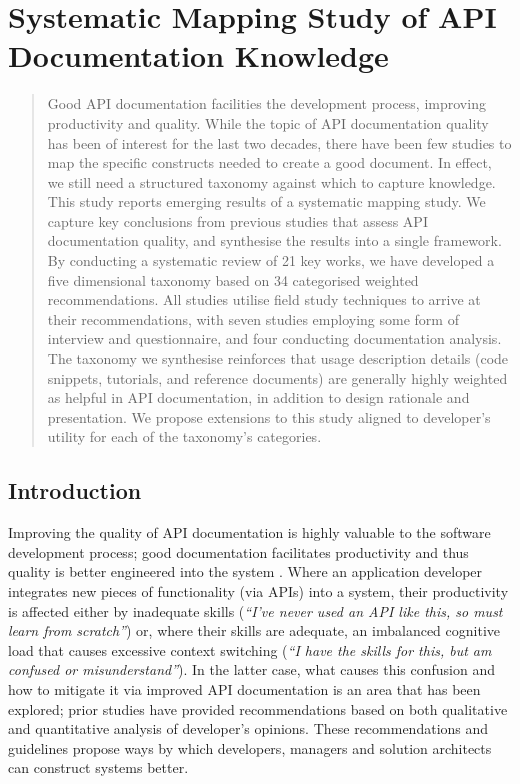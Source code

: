 \chapter[Systematic Mapping Study of API Documentation Knowledge]
{Systematic Mapping Study of API Documentation Knowledge}
\label{ch:esem2019}
\graphicspath{{mainmatter/publications/figures/esem2019/}}

\def \dima{Usage Description}
\def \dimb{Design Rationale}
\def \dimc{Domain Concepts}
\def \dimd{Support Artefacts}
\def \dime{Documentation Presentation}

\begin{abstract}
Good API documentation facilities the development process, improving productivity and quality.
While the topic of API documentation quality has been of interest for the last two decades, there have been few studies to map the specific constructs needed to create a good document. In effect, we still need a structured taxonomy against which to capture knowledge. 
This study reports emerging results of a systematic mapping study. We capture key conclusions from previous studies that assess API documentation quality, and synthesise the results into a single framework.
By conducting a systematic review of 21 key works, we have developed a five dimensional taxonomy based on 34 categorised weighted recommendations.
All studies utilise field study techniques to arrive at their recommendations, with seven studies employing some form of interview and questionnaire, and four conducting documentation analysis.
The taxonomy we synthesise reinforces that usage description details (code snippets, tutorials, and reference documents) are generally highly weighted as helpful in API documentation, in addition to design rationale and presentation.
We propose extensions to this study aligned to developer's utility for each of the taxonomy's categories.
\end{abstract}


\section{Introduction}

Improving the quality of API documentation is highly valuable to the software development process; good documentation facilitates productivity and thus quality is better engineered into the system \citep{mcleod2011factors}. Where an application developer integrates new pieces of functionality (via APIs) into a system, their productivity is affected either by inadequate skills (\textit{``I've never used an API like this, so must learn from scratch''}) or, where their skills are adequate, an imbalanced cognitive load that causes excessive context switching (\textit{``I have the skills for this, but am confused or misunderstand''}). In the latter case, what causes this confusion and how to mitigate it via improved API documentation is an area that has been explored; prior studies have provided recommendations based on both qualitative and quantitative analysis of developer's opinions. These recommendations and guidelines propose ways by which developers, managers and solution architects can construct systems better.

